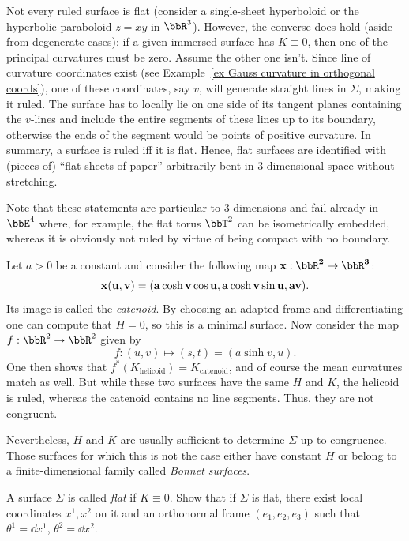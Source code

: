 \begin{rem}
    Not every ruled surface is flat (consider a single-sheet hyperboloid or the hyperbolic paraboloid $z=xy$ in $\bbR^3$). However, the converse does hold (aside from degenerate cases): if a given immersed surface has $K\equiv 0$, then one of the principal curvatures must be zero. Assume the other one isn't. Since line of curvature coordinates exist (see Example~\ref{ex Gauss curvature in orthogonal coords}), one of these coordinates, say $v$, will generate straight lines in $\Sigma$, making it ruled. The surface has to locally lie on one side of its tangent planes containing the $v$-lines and include the entire segments of these lines up to its boundary, otherwise the ends of the segment would be points of positive curvature. In summary, a surface is ruled iff it is flat. Hence, flat surfaces are identified with (pieces of) ``flat sheets of paper'' arbitrarily bent in $3$-dimensional space without stretching. 
    
    Note that these statements are particular to $3$ dimensions and fail already in $\bbE^4$ where, for example, the flat torus $\bbT^2$ can be isometrically embedded, whereas it is obviously not ruled by virtue of being compact with no boundary.
\end{rem}


\begin{example}[Catenoid]\label{ex catenoid}
    Let $a>0$ be a constant and consider the following map $\bf{x}:\bbR^2\to \bbR^3$:
    \[\bf{x}(u,v)=(a\cosh v\cos u,a\cosh v\sin u,av).\]
    Its image is called the \emph{catenoid}.
    By choosing an adapted frame and differentiating one can compute that $H=0$, so this is a minimal surface. Now consider the map $f:\bbR^2\to \bbR^2$ given by
    \[f: (u,v)\mapsto (s,t)=(a\sinh v,u).\]
    One then shows that $f^\ast(K_{\mathrm{helicoid}})=K_{\mathrm{catenoid}}$, and of course the mean curvatures match as well. But while these two surfaces have the same $H$ and $K$, the helicoid is ruled, whereas the catenoid contains no line segments. Thus, they are not congruent.
\end{example}

Nevertheless, $H$ and $K$ are usually sufficient to determine $\Sigma$ up to congruence. Those surfaces for which this is not the case either have constant $H$ or belong to a finite-dimensional family called \emph{Bonnet surfaces}.

\begin{xca}
    A surface $\Sigma$ is called \emph{flat} if $K\equiv 0$. Show that if $\Sigma$ is flat, there exist local coordinates $x^1,x^2$ on it and an orthonormal frame $(e_1,e_2,e_3)$ such that $\theta^1=\dd x^1$, $\theta^2=\dd x^2$.
\end{xca}





